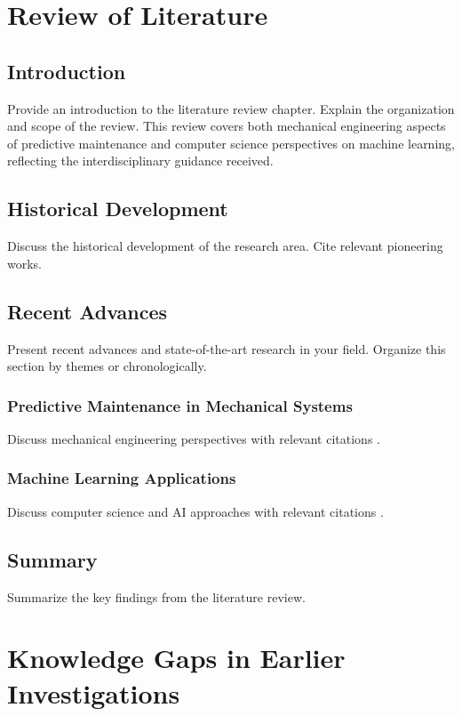 \documentclass[12pt,a4paper]{report}
\begin{document}
\chapter{Review of Literature}
\label{ch:literature}

\section{Introduction}
Provide an introduction to the literature review chapter.
Explain the organization and scope of the review. This review covers both mechanical engineering aspects of predictive maintenance and computer science perspectives on machine learning, reflecting the interdisciplinary guidance received.

\section{Historical Development}
Discuss the historical development of the research area. Cite relevant pioneering works.

\section{Recent Advances}
Present recent advances and state-of-the-art research in your field. Organize this section by themes or chronologically.

\subsection{Predictive Maintenance in Mechanical Systems}
Discuss mechanical engineering perspectives with relevant citations \cite{reference1}.

\subsection{Machine Learning Applications}
Discuss computer science and AI approaches with relevant citations \cite{reference2}.

\section{Summary}
Summarize the key findings from the literature review.

\chapter{Knowledge Gaps in Earlier Investigations}
\label{ch:gaps}
\end{document}
